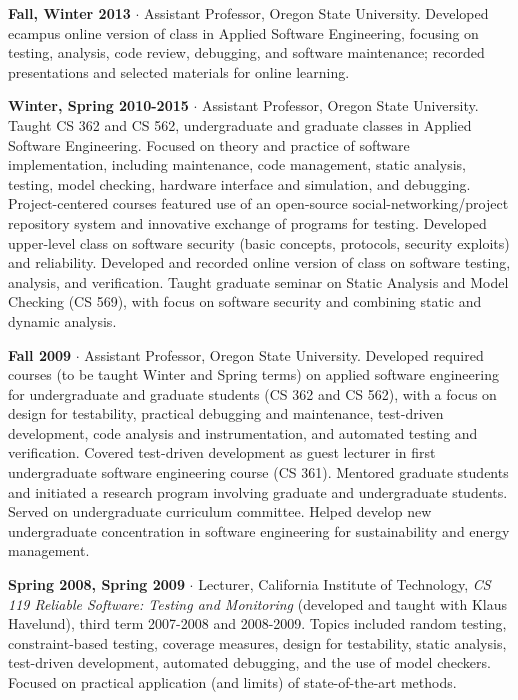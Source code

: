 \documentclass[ComputerScience]{vita}
\begin{document}
\begin{vita}
\begin{Teaching}
\item{\bf Fall, Winter 2013} $\cdot$ Assistant Professor, Oregon State University.  Developed ecampus online version of class in Applied Software Engineering, focusing on testing, analysis, code review, debugging, and software maintenance; recorded presentations and selected materials for online learning.

\item{\bf Winter, Spring 2010-2015} $\cdot$  Assistant Professor, Oregon State University.  Taught CS 362 and CS 562, undergraduate and graduate classes in Applied Software Engineering.  Focused on theory and practice of software implementation, including maintenance, code management, static analysis, testing, model checking, hardware interface and simulation, and debugging.  Project-centered courses featured use of an open-source social-networking/project repository system and  innovative exchange of programs for testing.  Developed upper-level class on software security (basic concepts, protocols, security exploits) and reliability.  Developed and recorded online version of class on software testing, analysis, and verification.  Taught graduate seminar on Static Analysis and Model Checking (CS 569), with focus on software security and combining static and dynamic analysis.

\item{\bf Fall 2009} $\cdot$ Assistant Professor, Oregon State
  University.  Developed required courses (to be taught Winter and
  Spring terms) on applied software engineering for undergraduate and
  graduate students (CS 362 and CS 562), with a focus on design for
  testability, practical debugging and maintenance, test-driven
  development, code analysis and instrumentation, and automated
  testing and verification. Covered test-driven development as guest
  lecturer in first undergraduate software engineering course (CS
  361). Mentored graduate students and initiated a research program
  involving graduate and undergraduate students.  Served on
  undergraduate curriculum committee. Helped develop new undergraduate
  concentration in software engineering for sustainability and energy
  management.

  \item {\bf Spring 2008, Spring 2009} $\cdot$ Lecturer, California
  Institute of Technology, \emph{CS 119 Reliable Software: Testing and
  Monitoring} (developed and taught with Klaus Havelund), third term
  2007-2008 and 2008-2009.  Topics included random testing,
  constraint-based testing, coverage measures, design for testability, static analysis,
  test-driven development, automated debugging, and the use of model
  checkers.  Focused on practical application (and limits)
  of state-of-the-art methods.


\end{Teaching}
\end{vita}
\end{document}
